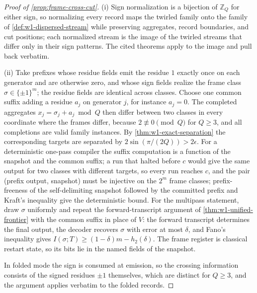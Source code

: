 \begin{proof}[Proof of \cref{prop:frame-cross-cut}]
(i) Sign normalization is a bijection of $\mathbb Z_Q$ for either sign, so
normalizing every record maps the twirled family onto the family of
\cref{def:w1-dispersed-stream} while preserving aggregates, record
boundaries, and cut positions; each normalized stream is the image of the
twirled streams that differ only in their sign patterns.  The cited
theorems apply to the image and pull back verbatim.

(ii) Take prefixes whose residue fields emit the residue $1$ exactly
once on each generator and are otherwise zero, and whose sign fields
realize the frame class $\sigma\in\{\pm1\}^m$; the residue fields are
identical across classes.  Choose one common suffix adding a residue
$a_j$ on generator $j$, for instance $a_j=0$.  The completed aggregates
$x_j=\sigma_j+a_j\bmod Q$ then differ between two classes in every
coordinate where the frames differ, because $2\not\equiv0\pmod Q$ for
$Q\geq3$, and all completions are valid family instances.  By
\cref{thm:w1-exact-separation} the corresponding targets are separated by
$2\sin(\pi/(2Q))>2\epsilon$.  For a deterministic one-pass compiler the
suffix computation is a function of the snapshot and the common suffix;
a run that halted before $c$ would give the same output for two classes
with different targets, so every run reaches $c$, and the pair (prefix
output, snapshot) must be injective on the $2^m$ frame classes; prefix-freeness of the self-delimiting snapshot followed by
the committed prefix and Kraft's inequality give the deterministic bound.
For the multipass statement, draw $\sigma$ uniformly and repeat the
forward-transcript argument of \cref{thm:w1-unified-frontier} with the
common suffix in place of $V$: the forward transcript determines the
final output, the decoder recovers $\sigma$ with error at most $\delta$,
and Fano's inequality gives $I(\sigma;T)\geq(1-\delta)m-h_2(\delta)$.
The frame register is classical restart state, so its bits lie in the
named fields of the snapshot.

In folded mode the sign is consumed at emission, so the crossing
information consists of the signed residues $\pm1$ themselves, which are
distinct for $Q\geq3$, and the argument applies verbatim to the folded
records.
\end{proof}

